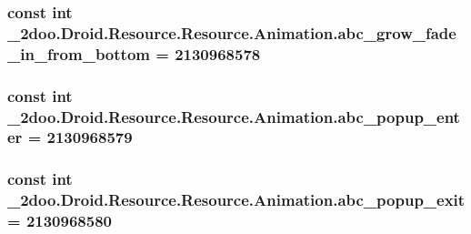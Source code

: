 \hypertarget{class__2doo_1_1_droid_1_1_resource_1_1_animation_92184652698454309031384a235bcff0}{
\subsubsection[{abc\_\-grow\_\-fade\_\-in\_\-from\_\-bottom}]{\setlength{\rightskip}{0pt plus 5cm}const int \_\-2doo.Droid.Resource.Resource.Animation.abc\_\-grow\_\-fade\_\-in\_\-from\_\-bottom = 2130968578}}
\label{class__2doo_1_1_droid_1_1_resource_1_1_animation_92184652698454309031384a235bcff0}


\hypertarget{class__2doo_1_1_droid_1_1_resource_1_1_animation_e6510899ec9b7c7b42fbc36fffd60f22}{
\subsubsection[{abc\_\-popup\_\-enter}]{\setlength{\rightskip}{0pt plus 5cm}const int \_\-2doo.Droid.Resource.Resource.Animation.abc\_\-popup\_\-enter = 2130968579}}
\label{class__2doo_1_1_droid_1_1_resource_1_1_animation_e6510899ec9b7c7b42fbc36fffd60f22}


\hypertarget{class__2doo_1_1_droid_1_1_resource_1_1_animation_974120b927b87d71f97a6c54ad3eece7}{
\subsubsection[{abc\_\-popup\_\-exit}]{\setlength{\rightskip}{0pt plus 5cm}const int \_\-2doo.Droid.Resource.Resource.Animation.abc\_\-popup\_\-exit = 2130968580}}
\label{class__2doo_1_1_droid_1_1_resource_1_1_animation_974120b927b87d71f97a6c54ad3eece7}


